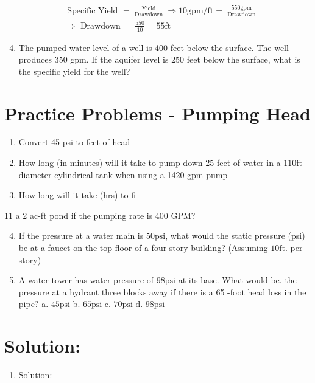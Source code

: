 \documentclass[10pt]{article}
\begin{document}
\begin{enumerate}
\begin{enumerate}
$$
\begin{aligned}
& \text { Specific Yield }=\frac{\text { Yield }}{\text { Drawdown }} \Longrightarrow 10 \mathrm{gpm} / \mathrm{ft}=\frac{550 \mathrm{gpm}}{\text { Drawdown }} \\
& \Longrightarrow \text { Drawdown }=\frac{550}{10}=55 \mathrm{ft}
\end{aligned}
$$

\begin{enumerate}
  \setcounter{enumi}{3}
  \item The pumped water level of a well is 400 feet below the surface. The well produces 350 gpm. If the aquifer level is 250 feet below the surface, what is the specific yield for the well?
\end{enumerate}

\section{Practice Problems - Pumping Head}
\begin{enumerate}
  \item Convert 45 psi to feet of head

  \item How long (in minutes) will it take to pump down 25 feet of water in a $110 \mathrm{ft}$ diameter cylindrical tank when using a 1420 gpm pump

  \item How long will it take (hrs) to fi

\end{enumerate}

11 a 2 ac-ft pond if the pumping rate is 400 GPM?

\begin{enumerate}
  \setcounter{enumi}{3}
  \item If the pressure at a water main is $50 \mathrm{psi}$, what would the static pressure (psi) be at a faucet on the top floor of a four story building? (Assuming $10 \mathrm{ft}$. per story)

  \item A water tower has water pressure of $98 \mathrm{psi}$ at its base. What would be. the pressure at a hydrant three blocks away if there is a 65 -foot head loss in the pipe?
a. $45 \mathrm{psi}$
b. $65 \mathrm{psi}$
c. $70 \mathrm{psi}$
d. $98 \mathrm{psi}$

\end{enumerate}

\section{Solution:}
\begin{enumerate}
  \item Solution:
\end{enumerate}


\end{enumerate}
\end{enumerate}
\end{document}
